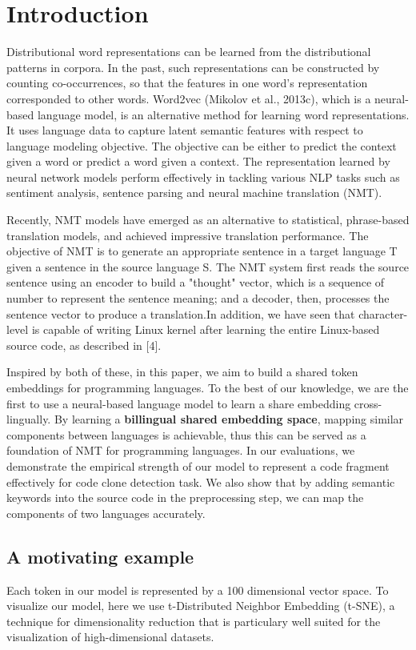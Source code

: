 \section{Introduction}

Distributional word representations can be learned from the distributional patterns in corpora. In the past, such representations can be constructed by counting co-occurrences, so that the features in one word's representation corresponded to other words. Word2vec (Mikolov et al., 2013c), which is a neural-based language model, is an alternative method for learning word representations. It uses language data to capture latent semantic features with respect to language modeling objective. The objective can be either to predict the context given a word or predict a word given a context. The representation learned by neural network models perform effectively in tackling various NLP tasks such as sentiment analysis, sentence parsing and neural machine translation (NMT).

Recently, NMT models have emerged as an alternative to statistical, phrase-based translation models, and achieved impressive translation performance. The objective of NMT is to generate an appropriate sentence in a target language T given a sentence in the source language S. The NMT system first reads the source sentence using an encoder to build a "thought" vector, which is a sequence of number to represent the sentence meaning; and a decoder, then, processes the sentence vector to produce a translation.In addition, we have seen that character-level is capable of writing Linux kernel after learning the entire Linux-based source code, as described in [4]. 

Inspired by both of these, in this paper, we aim to build a shared token embeddings for programming languages. To the best of our knowledge, we are the first to use a neural-based language model to learn a share embedding cross-lingually. By learning a \textbf{billingual shared embedding space}, mapping similar components between languages is achievable, thus this can be served as a foundation of NMT for programming languages. In our evaluations, we demonstrate the empirical strength of our model to represent a code fragment effectively for code clone detection task. We also show that by adding semantic keywords into the source code in the preprocessing step, we can map the components of two languages accurately. 



\subsection{A motivating example}
Each token in our model is represented by a 100 dimensional vector space. To visualize our model, here we use t-Distributed Neighbor Embedding (t-SNE), a technique for dimensionality reduction that is particulary well suited for the visualization of high-dimensional datasets. 

